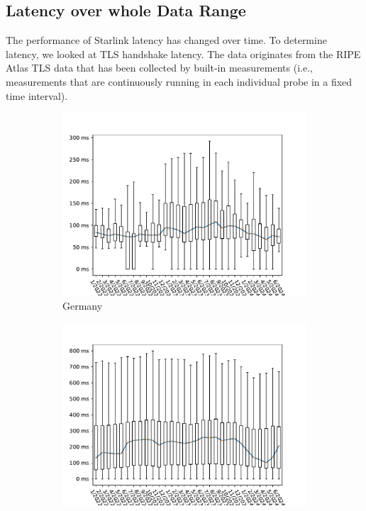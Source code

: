 \subsection{Latency over whole Data Range} \label{sec:latency-wholerange}

The performance of Starlink latency has changed over time. To determine
latency, we looked at TLS handshake latency. The data originates from the RIPE
Atlas TLS data that has been collected by built-in measurements (i.e.,
measurements that are continuously running in each individual probe in a fixed
time interval).

\begin{figure}
	\centering
	\begin{subfigure}[b]{0.47\linewidth}
		\includegraphics[width=\linewidth]{chapters/4-results/latency/img/latency_2022_to_2024_Germany.pdf}
		\caption{Germany}
	\end{subfigure}
	\begin{subfigure}[b]{0.47\linewidth}
		\includegraphics[width=\linewidth]{chapters/4-results/latency/img/latency_2022_to_2024_United States.pdf}

\end{subfigure}
\end{figure}

